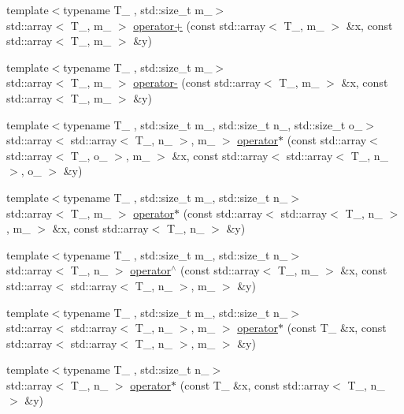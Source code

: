 \begin{DoxyCompactItemize}
{\footnotesize template$<$typename T\_\- , std::size\_\-t m\_\-$>$ }\\std::array$<$ T\_\-, m\_\- $>$ \hyperlink{namespaceeos_a77b0b1d58e1ff492fd660967a4dd6afa}{operator+} (const std::array$<$ T\_\-, m\_\- $>$ \&x, const std::array$<$ T\_\-, m\_\- $>$ \&y)
\item 
{\footnotesize template$<$typename T\_\- , std::size\_\-t m\_\-$>$ }\\std::array$<$ T\_\-, m\_\- $>$ \hyperlink{namespaceeos_aa8fefb77f2ab33ac602411123a62b956}{operator-\/} (const std::array$<$ T\_\-, m\_\- $>$ \&x, const std::array$<$ T\_\-, m\_\- $>$ \&y)
\item 
{\footnotesize template$<$typename T\_\- , std::size\_\-t m\_\-, std::size\_\-t n\_\-, std::size\_\-t o\_\-$>$ }\\std::array$<$ std::array$<$ T\_\-, n\_\- $>$, m\_\- $>$ \hyperlink{namespaceeos_a6025a42d446265afd81f6c749999a391}{operator$\ast$} (const std::array$<$ std::array$<$ T\_\-, o\_\- $>$, m\_\- $>$ \&x, const std::array$<$ std::array$<$ T\_\-, n\_\- $>$, o\_\- $>$ \&y)
\item 
{\footnotesize template$<$typename T\_\- , std::size\_\-t m\_\-, std::size\_\-t n\_\-$>$ }\\std::array$<$ T\_\-, m\_\- $>$ \hyperlink{namespaceeos_adf0061c40e232b18c6cb38c998b4cde1}{operator$\ast$} (const std::array$<$ std::array$<$ T\_\-, n\_\- $>$, m\_\- $>$ \&x, const std::array$<$ T\_\-, n\_\- $>$ \&y)
\item 
{\footnotesize template$<$typename T\_\- , std::size\_\-t m\_\-, std::size\_\-t n\_\-$>$ }\\std::array$<$ T\_\-, n\_\- $>$ \hyperlink{namespaceeos_a6d8071776e060cb58300bc883d5510b7}{operator$^\wedge$} (const std::array$<$ T\_\-, m\_\- $>$ \&x, const std::array$<$ std::array$<$ T\_\-, n\_\- $>$, m\_\- $>$ \&y)
\item 
{\footnotesize template$<$typename T\_\- , std::size\_\-t m\_\-, std::size\_\-t n\_\-$>$ }\\std::array$<$ std::array$<$ T\_\-, n\_\- $>$, m\_\- $>$ \hyperlink{namespaceeos_ab6da54e708e1d703fd399d7e7a0912f8}{operator$\ast$} (const T\_\- \&x, const std::array$<$ std::array$<$ T\_\-, n\_\- $>$, m\_\- $>$ \&y)
\item 
{\footnotesize template$<$typename T\_\- , std::size\_\-t n\_\-$>$ }\\std::array$<$ T\_\-, n\_\- $>$ \hyperlink{namespaceeos_a6192a8a135c1f4ea6163e1d7f59275a0}{operator$\ast$} (const T\_\- \&x, const std::array$<$ T\_\-, n\_\- $>$ \&y)

\end{DoxyCompactItemize}
